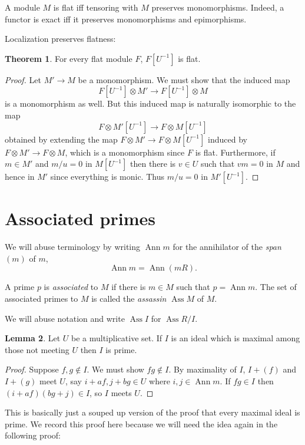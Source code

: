\documentclass[12pt]{book}
\DeclareMathOperator{\Ann}{Ann}
\DeclareMathOperator{\Ass}{Ass}
\newcommand{\dfn}[1]{\emph{#1}\index{#1}}
\theoremstyle{definition}
\newtheorem{theorem}{Theorem}[chapter]
\newtheorem{lemma}[theorem]{Lemma}
\newenvironment{definition}
  {\pushQED{\qed}\renewcommand{\qedsymbol}{$\diamondsuit$}\definitionx}
  {\popQED\endexamplex}
\begin{document}
A module $M$ is flat iff tensoring with $M$ preserves monomorphisms.
Indeed, a functor is exact iff it preserves monomorphisms and epimorphisms.

Localization preserves flatness:

\begin{theorem}
For every flat module $F$, $F[U^{-1}]$ is flat.
\end{theorem}
\begin{proof}
Let $M' \to M$ be a monomorphism. We must show that the induced map
$$F[U^{-1}] \otimes M' \to F[U^{-1}] \otimes M$$
is a monomorphism as well.
But this induced map is naturally isomorphic to the map
$$F \otimes M'[U^{-1}] \to F \otimes M[U^{-1}]$$
obtained by extending the map $F \otimes M' \to F \otimes M[U^{-1}]$ induced by $F \otimes M' \to F \otimes M$, which is a monomorphism since $F$ is flat.
Furthermore, if $m \in M'$ and $m/u = 0$ in $M[U^{-1}]$ then there is $v \in U$ such that $vm = 0$ in $M$ and hence in $M'$ since everything is monic.
Thus $m/u = 0$ in $M'[U^{-1}]$.
\end{proof}

\section{Associated primes}
We will abuse terminology by writing $\Ann m$ for the annihilator of the \emph{span} $(m)$ of $m$,
$$\Ann m = \Ann(mR).$$

\begin{definition}
A prime $p$ is \dfn{associated} to $M$ if there is $m \in M$ such that $p = \Ann m$.
The set of associated primes to $M$ is called the \dfn{assassin} $\Ass M$ of $M$.
\end{definition}

We will abuse notation and write $\Ass I$ for $\Ass R/I$.

\begin{lemma}
Let $U$ be a multiplicative set.
If $I$ is an ideal which is maximal among those not meeting $U$ then $I$ is prime.
\end{lemma}
\begin{proof}
Suppose $f,g \notin I$. We must show $fg \notin I$.
By maximality of $I$, $I + (f)$ and $I + (g)$ meet $U$, say $i + af, j + bg \in U$ where $i,j \in \Ann m$.
If $fg \in I$ then $(i + af)(bg + j) \in I$, so $I$ meets $U$.
\end{proof}

This is basically just a souped up version of the proof that every maximal ideal is prime.
We record this proof here because we will need the idea again in the following proof:
\end{document}
